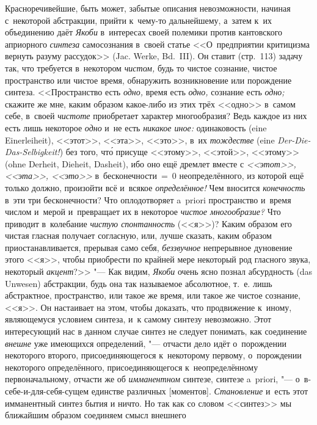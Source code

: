 Красноречивейшие, быть может, забытые описания невозможности, начиная
с~некоторой абстракции, прийти к~чему-то дальнейшему, а~затем к~их объединению
даёт {\em Якоби} в~интересах своей полемики против кантовского априорного
{\em синтеза} самосознания в~своей статье <<О~предприятии критицизма вернуть
разуму рассудок>> (Jac. Werke, Bd.~III). Он ставит (стр.~113) задачу так, что
требуется в~некотором {\em чистом,} будь то чистое сознание, чистое
пространство или чистое время, обнаружить возникновение или порождение синтеза.
<<Пространство есть {\em одно,} время есть {\em одно,} сознание есть
{\em одно;} скажите же мне, каким образом какое-либо из этих трёх <<одно>> в~самом
себе, в~своей {\em чистоте} приобретает характер многообразия? Ведь
каждое из них есть лишь некоторое {\em одно} и~не есть {\em никакое иное:}
одинаковость (eine Einer\-lei\-heit), <<этот>>, <<эта>>, <<это>>, в~их
{\em тождестве} (eine {\em Der-Die-Das-Selbigkeit!}) без того, чт\'{о} присуще
<<этому>>, <<этой>>, <<этому>> (ohne Derheit, Dieheit, Dasheit), ибо оно ещё
дремлет вместе с {\em <<этот>>, <<эта>>, <<это>>} в~бесконечности~=~0
неопределённого, из которой ещё только должно, произойти всё и~всякое
{\em определённое!} Чем вносится {\em конечность} в~эти три бесконечности? Что
оплодотворяет a~priori пространство и~время числом и~мерой и~превращает их в
некоторое {\em чистое многообразие?} Что приводит в~колебание
{\em чистую спонтанность} (<<я>>)? Каким образом его чистая гласная получает согласную,
или, лучше сказать, каким образом приостанавливается, прерывая само себя,
{\em беззвучное} непрерывное дуновение этого <<я>>, чтобы приобрести по крайней мере
некоторый род гласного звука, некоторый {\em акцент}?>> "--- Как видим,
{\em Якоби} очень ясно познал абсурдность (das Unwesen) абстракции, будь она так
называемое абсолютное, т.~е. лишь абстрактное, пространство, или такое же
время, или такое же чистое сознание, <<я>>. Он настаивает на этом, чтобы
доказать, что продвижение к~иному,
являющемуся условием синтеза, и~к самому синтезу невозможно. Этот интересующий нас в
данном случае синтез не следует понимать, как соединение {\em внешне} уже
имеющихся определений, "--- отчасти дело идёт о~порождении некоторого второго,
присоединяющегося к~некоторому первому, о~порождении некоторого определённого,
присоединяющегося к~неопределённому первоначальному, отчасти же об
{\em имманентном} синтезе, синтезе a~priori, "--- о~в-себе-и-для-себя-сущем единстве
различных [моментов]. {\em Становление} и~есть этот имманентный синтез бытия и
ничто. Но так как со словом <<синтез>> мы ближайшим образом соединяем смысл внешнего
